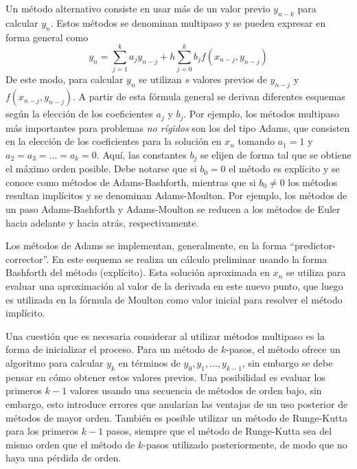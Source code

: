 Un método alternativo consiste en usar más de un valor previo $y_{n-k}$ para calcular $y_{n}$. Estos métodos se denominan multipaso y se pueden expresar en forma general como
\begin{equation}
 y_{n} = \sum_{j=1}^{k}{a_j y_{n-j}} + h \sum_{j=0}^{k}{b_j f(x_{n-j}, y_{n-j})}
\end{equation} 
 De este modo, para calcular $y_n$ se utilizan $s$ valores previos de $y_{n-j}$ y $f(x_{n-j}, y_{n-j})$. A partir de esta fórmula general se derivan diferentes esquemas según la elección de los coeficientes $a_j$ y $b_j$. Por ejemplo, los métodos multipaso más importantes para problemas \textit{no rígidos} son los del tipo Adams, que consisten en la elección de los coeficientes para la solución en $x_n$ tomando $a_1 = 1$ y $a_2 = a_3 = \ldots = a_k = 0$. Aquí, las constantes $b_j$ se elijen de forma tal que se obtiene el máximo orden posible. Debe notarse que si $b_0 = 0$ el método es explícito y se conoce como métodos de Adams-Bashforth, mientras que si $b_0 \neq 0$ los métodos resultan implícitos y se denominan Adams-Moulton. Por ejemplo, los métodos de un paso Adams-Bashforth y Adams-Moulton se reducen a los métodos de Euler hacia adelante y hacia atrás, respectivamente. 
 
 Los métodos de Adams se implementan, generalmente, en la forma ``predictor-corrector''. En este esquema se realiza un cálculo preliminar usando la forma Bashforth del método (explícito). Esta solución aproximada en $x_n$ se utiliza para evaluar una aproximación al valor de la derivada en este nuevo punto, que luego es utilizada en la fórmula de Moulton como valor inicial para resolver el método implícito. 
 
 Una cuestión que es necesaria considerar al utilizar métodos multipaso es la forma de inicializar el proceso. Para un método de $k$-pasos, el método ofrece un algoritmo para calcular $y_k$ en términos de $y_0, y_1, \ldots, y_{k-1}$, sin embargo se debe pensar en cómo obtener estos valores previos. Una posibilidad es evaluar los primeros $k-1$ valores usando una secuencia de métodos de orden bajo, sin embargo, esto introduce errores que anularían las ventajas de un uso posterior de métodos de mayor orden. También es posible utilizar un método de Runge-Kutta para los primeros $k-1$ pasos, siempre que el método de Runge-Kutta sea del mismo orden que el método de $k$-pasos utilizado posteriormente, de modo que no haya una pérdida de orden.
 
